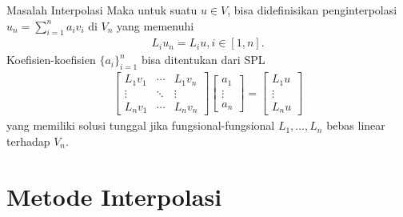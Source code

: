 \documentclass[xcolor={dvipsnames}, 9pt]{beamer}
\begin{document}
    \begin{frame}{Masalah Interpolasi}
        Maka untuk suatu $u\in V$, bisa didefinisikan penginterpolasi $u_n = \sum_{i=1}^n a_iv_i$ di $V_n$ yang memenuhi
        \begin{align*}
            L_iu_n = L_iu, i\in[1,n].
        \end{align*}
        Koefisien-koefisien $\{a_i\}_{i=1}^n$ bisa ditentukan dari SPL
        \begin{align*}
            \begin{bmatrix}
                L_1v_1 & \cdots & L_1v_n \\
                \vdots & \ddots & \vdots \\
                L_nv_1 & \cdots & L_nv_n
            \end{bmatrix}
            \begin{bmatrix}
                a_1 \\ \vdots \\ a_n
            \end{bmatrix}=
            \begin{bmatrix}
                L_1u \\ \vdots \\ L_nu
            \end{bmatrix}
        \end{align*}
        yang memiliki solusi tunggal jika fungsional-fungsional $L_1,\dots,L_n$ bebas linear terhadap $V_n$.
    \end{frame}
    \section{Metode Interpolasi}
\end{document}
